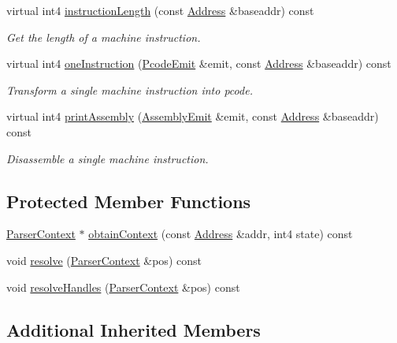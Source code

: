 \begin{DoxyCompactItemize}
virtual int4 \mbox{\hyperlink{class_sleigh_aec2a92a6246fd8d2704d1f853f01ee85}{instruction\+Length}} (const \mbox{\hyperlink{class_address}{Address}} \&baseaddr) const
\begin{DoxyCompactList}\small\item\em Get the length of a machine instruction. \end{DoxyCompactList}\item 
virtual int4 \mbox{\hyperlink{class_sleigh_a7221a746dae0e1acfd2189a192974fe0}{one\+Instruction}} (\mbox{\hyperlink{class_pcode_emit}{Pcode\+Emit}} \&emit, const \mbox{\hyperlink{class_address}{Address}} \&baseaddr) const
\begin{DoxyCompactList}\small\item\em Transform a single machine instruction into pcode. \end{DoxyCompactList}\item 
virtual int4 \mbox{\hyperlink{class_sleigh_a21c8622098202b1746bcda972d59d9aa}{print\+Assembly}} (\mbox{\hyperlink{class_assembly_emit}{Assembly\+Emit}} \&emit, const \mbox{\hyperlink{class_address}{Address}} \&baseaddr) const
\begin{DoxyCompactList}\small\item\em Disassemble a single machine instruction. \end{DoxyCompactList}\end{DoxyCompactItemize}
\subsection*{Protected Member Functions}
\begin{DoxyCompactItemize}
\item 
\mbox{\hyperlink{class_parser_context}{Parser\+Context}} $\ast$ \mbox{\hyperlink{class_sleigh_abab71643681aaa776f4e4c5d643be3a3}{obtain\+Context}} (const \mbox{\hyperlink{class_address}{Address}} \&addr, int4 state) const
\item 
void \mbox{\hyperlink{class_sleigh_a54c142d4cf4954c6e9f5c32e9e96a215}{resolve}} (\mbox{\hyperlink{class_parser_context}{Parser\+Context}} \&pos) const
\item 
void \mbox{\hyperlink{class_sleigh_a6feb982ab58134d1ad3730d9e252906c}{resolve\+Handles}} (\mbox{\hyperlink{class_parser_context}{Parser\+Context}} \&pos) const
\end{DoxyCompactItemize}
\subsection*{Additional Inherited Members}


